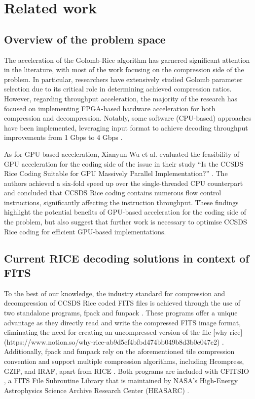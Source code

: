\documentclass[licencjacka,en]{pracamgr}
\begin{document}
\chapter{Related work}

\section{Overview of the problem space}
The acceleration of the Golomb-Rice algorithm has garnered significant attention in the literature, with most of the work focusing on the compression side of the problem. In particular, researchers have extensively studied Golomb parameter selection due to its critical role in determining achieved compression ratios. However, regarding throughput acceleration, the majority of the research has focused on implementing FPGA-based hardware acceleration for both compression and decompression. Notably, some software (CPU-based) approaches have been implemented, leveraging input format to achieve decoding throughput improvements from 1 Gbps to 4 Gbps \cite{fpga-dec}.

As for GPU-based acceleration, Xianyun Wu et al. evaluated the feasibility of GPU acceleration for the coding side of the issue in their study “Is the CCSDS Rice Coding Suitable for GPU Massively Parallel Implementation?” \cite{gpu-rice}. The authors achieved a six-fold speed up over the single-threaded CPU counterpart and concluded that CCSDS Rice coding contains numerous flow control instructions, significantly affecting the instruction throughput. These findings highlight the potential benefits of GPU-based acceleration for the coding side of the problem, but also suggest that further work is necessary to optimise CCSDS Rice coding for efficient GPU-based implementations.

\section{Current RICE decoding solutions in context of FITS}
To the best of our knowledge, the industry standard for compression and decompression of CCSDS Rice coded FITS files is achieved through the use of two standalone programs, fpack and funpack \cite{funpack-man}. These programs offer a unique advantage as they directly read and write the compressed FITS image format, eliminating the need for creating an uncompressed version of the file [why-rice](https://www.notion.so/why-rice-ab9d5ef4bfbd474bb049b8d3b0e047c2) . Additionally, fpack and funpack rely on the aforementioned tile compression convention and support multiple compression algorithms, including Hcompress, GZIP, and IRAF, apart from RICE \cite{funpack-user}. Both programs are included with CFITSIO\cite{funpack-man} , a FITS File Subroutine Library that is maintained by NASA’s High-Energy Astrophysics Science Archive Research Center (HEASARC) \cite{cfitsio}.
\end{document}
